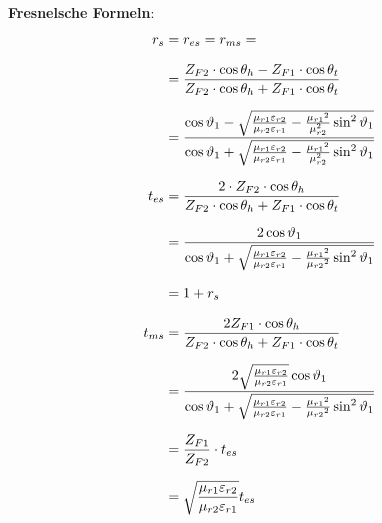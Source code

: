 \textbf{Fresnelsche Formeln}:
\begin{equation*}
	\setlength{\jot}{10pt}
	\begin{aligned}
		r_s    & =  r_{es} = r_{ms} =                                                                                                                                            \\
		& = \frac{Z_{F2} \cdot \cos \theta_h-Z_{F1} \cdot \cos \theta_t}{Z_{F2} \cdot \cos \theta_h+Z_{F1} \cdot \cos \theta_t}                                           \\
& =\frac{\cos \vartheta_1-\sqrt{\frac{\mu_{r 1} \varepsilon_{r 2}}{\mu_{r 2} \varepsilon_{r 1}}-\frac{\mu_{r 1}{ }^2}{\mu_{r 2}^2} \sin ^2 \vartheta_1}}{\cos \vartheta_1+\sqrt{\frac{\mu_{r 1} \varepsilon_{r 2}}{\mu_{r 2} \varepsilon_{r 1}}-\frac{\mu_{r 1}{ }^2}{\mu_{r 2}^2} \sin ^2 \vartheta_1}} \\
		t_{es} & =\frac{2 \cdot	 Z_{F2} \cdot \cos \theta_h}{Z_{F2} \cdot \cos \theta_h+Z_{F1} \cdot \cos \theta_t}                                                              \\
& =\frac{2 \cos \vartheta_1}{\cos \vartheta_1+\sqrt{\frac{\mu_{r 1} \varepsilon_{r 2}}{\mu_{r 2} \varepsilon_{r 1}}-\frac{\mu_{r 1}{ }^2}{\mu_{r 2}{ }^2} \sin ^2 \vartheta_1}} \\
		& = 1+r_s\\
		t_{ms} & = \frac{2 Z_{F1} \cdot \cos \theta_h}{Z_{F2} \cdot \cos \theta_h+Z_{F1} \cdot \cos \theta_t}                                                              \\
		& =\frac{2 \sqrt{\frac{\mu_{r 1} \varepsilon_{r 2}}{\mu_{r 2} \varepsilon_{r 1}}} \cos \vartheta_1}{\cos \vartheta_1+\sqrt{\frac{\mu_{r 1} \varepsilon_{r 2}}{\mu_{r 2} \varepsilon_{r 1}}-\frac{\mu_{r 1}{ }^2}{\mu_{r 2}{ }^2} \sin ^2 \vartheta_1}}
		\\
		& = \frac{Z_{F1}}{Z_{F2}}\cdot t_{es}\\
		& =\sqrt{\frac{\mu_{r 1} \varepsilon_{r 2}}{\mu_{r 2} \varepsilon_{r 1}}} t_{e s}                                                                                                                   
	\end{aligned}
\end{equation*}


